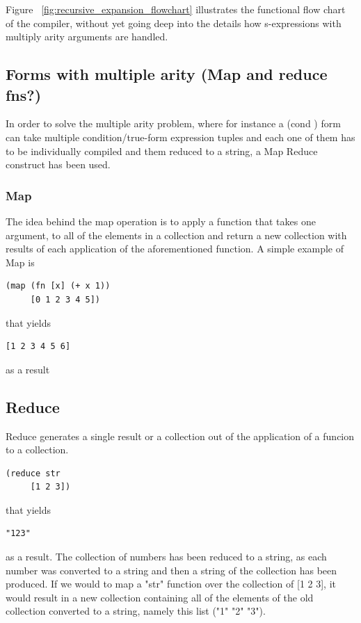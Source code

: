Figure ~\ref{fig:recursive_expansion_flowchart} illustrates the functional flow chart of the compiler, without yet going deep into the details how s-expressions with multiply arity arguments are handled. 

\subsection{Forms with multiple arity (Map and reduce fns?)}

In order to solve the multiple arity problem, where for instance a (cond ) form can take multiple condition/true-form expression tuples and each one of them has to be individually compiled and them reduced to a string, a Map Reduce construct has been used. 

\subsubsection{Map}
The idea behind the map operation is to apply a function that takes one argument, to all of the elements in a collection and return a new collection with results of each application of the aforementioned function. 
A simple example of Map is 

\begin{verbatim}
(map (fn [x] (+ x 1)) 
	 [0 1 2 3 4 5])
\end{verbatim}
that yields 
\begin{verbatim}
[1 2 3 4 5 6]
\end{verbatim}
as a result

\subsection{Reduce}
Reduce generates a single result or a collection out of the application of a funcion to a collection.	

\begin{verbatim}
(reduce str 
	 [1 2 3])
\end{verbatim}
that yields 
\begin{verbatim}
"123"
\end{verbatim}
as a result. The collection of numbers has been reduced to a string, as each number was converted to a string and then a string of the collection has been produced.
If we would to map a "str" function over the collection of [1 2 3], it would result in a new collection containing all of the elements of the old collection converted to a string, namely this list ("1" "2" "3").

